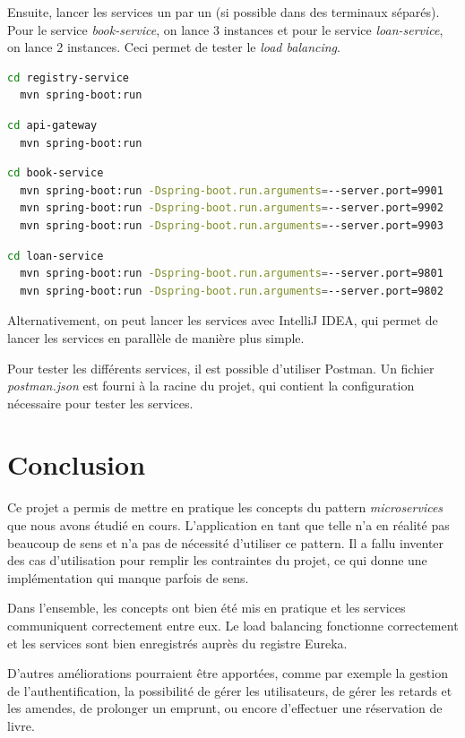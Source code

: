 \documentclass[
  french,
  a4paper,
]{scrartcl}
\begin{document}
Ensuite, lancer les services un par un (si possible dans des terminaux séparés). Pour 
le service \textit{book-service}, on lance 3 instances et pour le service \textit{loan-service},
on lance 2 instances. Ceci permet de tester le \textit{load balancing}.

\begin{lstlisting}[language=bash]
  cd registry-service
  mvn spring-boot:run
\end{lstlisting}

\begin{lstlisting}[language=bash]
  cd api-gateway
  mvn spring-boot:run
\end{lstlisting}

\begin{lstlisting}[language=bash]
  cd book-service
  mvn spring-boot:run -Dspring-boot.run.arguments=--server.port=9901
  mvn spring-boot:run -Dspring-boot.run.arguments=--server.port=9902
  mvn spring-boot:run -Dspring-boot.run.arguments=--server.port=9903
\end{lstlisting}

\begin{lstlisting}[language=bash]
  cd loan-service
  mvn spring-boot:run -Dspring-boot.run.arguments=--server.port=9801
  mvn spring-boot:run -Dspring-boot.run.arguments=--server.port=9802
\end{lstlisting}

Alternativement, on peut lancer les services avec IntelliJ IDEA, qui permet 
de lancer les services en parallèle de manière plus simple. 

Pour tester les différents services, il est possible d'utiliser Postman. Un fichier 
\textit{postman.json} est fourni à la racine du projet, qui contient la configuration 
nécessaire pour tester les services. 

\section{Conclusion}

Ce projet a permis de mettre en pratique les concepts du pattern \textit{microservices} que nous avons
étudié en cours. 
L'application en tant que telle n'a en réalité pas beaucoup de sens et n'a pas de nécessité d'utiliser 
ce pattern. Il a fallu inventer des cas d'utilisation pour remplir les contraintes du projet, ce qui 
donne une implémentation qui manque parfois de sens. 

Dans l'ensemble, les concepts ont bien été mis en pratique et les services communiquent correctement 
entre eux. Le load balancing fonctionne correctement et les services sont bien enregistrés auprès du
registre Eureka. 

D'autres améliorations pourraient être apportées, comme par exemple la gestion de l'authentification, 
la possibilité de gérer les utilisateurs, de gérer les retards et les amendes, de prolonger un emprunt, 
ou encore d'effectuer une réservation de livre. 
 
\end{document}
